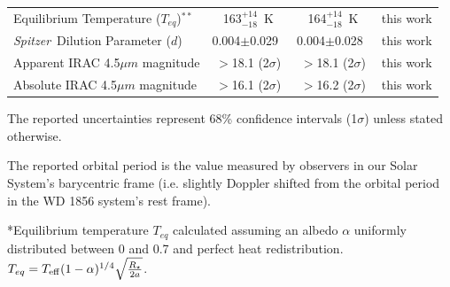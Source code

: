 \documentclass{nature3}
\newcommand*{\bedit}{\textcolor{new_black}}
\newcommand{\project}[1]{\textsl{#1}}
\newcommand{\Spitzer}{\project{Spitzer}}
\newcommand{\teqb}{163}
\newcommand{\uteqb}{\ensuremath{^{+14}_{-18}}}
\newcommand{\dspit}{0.004}
\newcommand{\udspit}{\ensuremath{\pm}0.029}
\newcommand{\teqbecc}{164}
\newcommand{\uteqbecc}{\ensuremath{^{+14}_{-18}}}
\newcommand{\dspitecc}{0.004}
\newcommand{\udspitecc}{\ensuremath{\pm}0.028}
\begin{document}
\begin{table}
\begin{threeparttable}
\begin{tabular}{lccc}
Equilibrium Temperature ($T_{eq}$)$^{**}$ &\teqb\uteqb\ K&\teqbecc\uteqbecc\ K& this work\\
\Spitzer\ Dilution Parameter ($d$) &\dspit\udspit\ &\dspitecc\udspitecc\ & this work\\
\bedit{Apparent IRAC 4.5$\mu m$ magnitude} & \bedit{$>$18.1 (2$\sigma$)} & \bedit{$>$18.1 (2$\sigma$)} & \bedit{this work}\\
\bedit{Absolute IRAC 4.5$\mu m$ magnitude} & \bedit{$>$16.1 (2$\sigma$)} &\bedit{$>$16.2 (2$\sigma$)} & \bedit{this work}\\



\hline
\end{tabular}
    \begin{tablenotes}
      \scriptsize
      \item \bedit{The reported uncertainties represent 68\% confidence intervals (1$\sigma$) unless stated otherwise.} 
      \item *The reported orbital period is the value measured by observers in our Solar System's barycentric frame (i.e. slightly Doppler shifted from the orbital period in the WD 1856 system's rest frame).
      \item **Equilibrium temperature $T_{eq}$ calculated assuming an albedo $\alpha$ uniformly distributed between 0 and 0.7 and perfect heat redistribution. $T_{eq}=T_{\rm eff}(1 - \alpha)^{1/4}\sqrt{\frac{R_\star}{2a}}$.
    \end{tablenotes}
  \end{threeparttable}
\end{table}
\end{document}
